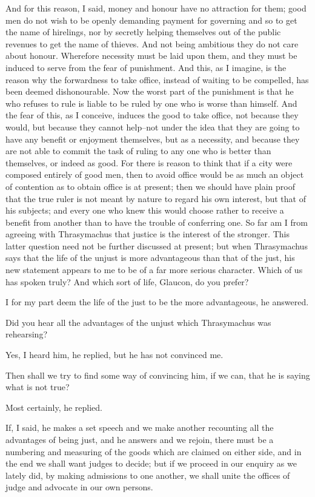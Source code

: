 And for this reason, I said, money and honour have no attraction for
them; good men do not wish to be openly demanding payment for governing
and so to get the name of hirelings, nor by secretly helping themselves
out of the public revenues to get the name of thieves. And not being
ambitious they do not care about honour. Wherefore necessity must be
laid upon them, and they must be induced to serve from the fear of
punishment. And this, as I imagine, is the reason why the forwardness
to take office, instead of waiting to be compelled, has been deemed
dishonourable. Now the worst part of the punishment is that he who
refuses to rule is liable to be ruled by one who is worse than himself.
And the fear of this, as I conceive, induces the good to take office,
not because they would, but because they cannot help--not under the idea
that they are going to have any benefit or enjoyment themselves, but as
a necessity, and because they are not able to commit the task of ruling
to any one who is better than themselves, or indeed as good. For there
is reason to think that if a city were composed entirely of good men,
then to avoid office would be as much an object of contention as to
obtain office is at present; then we should have plain proof that the
true ruler is not meant by nature to regard his own interest, but that
of his subjects; and every one who knew this would choose rather to
receive a benefit from another than to have the trouble of conferring
one. So far am I from agreeing with Thrasymachus that justice is the
interest of the stronger. This latter question need not be further
discussed at present; but when Thrasymachus says that the life of the
unjust is more advantageous than that of the just, his new statement
appears to me to be of a far more serious character. Which of us has
spoken truly? And which sort of life, Glaucon, do you prefer?

I for my part deem the life of the just to be the more advantageous, he
answered.

Did you hear all the advantages of the unjust which Thrasymachus was
rehearsing?

Yes, I heard him, he replied, but he has not convinced me.

Then shall we try to find some way of convincing him, if we can, that he
is saying what is not true?

Most certainly, he replied.

If, I said, he makes a set speech and we make another recounting all the
advantages of being just, and he answers and we rejoin, there must be a
numbering and measuring of the goods which are claimed on either side,
and in the end we shall want judges to decide; but if we proceed in our
enquiry as we lately did, by making admissions to one another, we shall
unite the offices of judge and advocate in our own persons.

